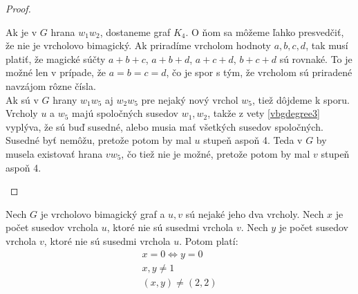 \begin{proof}
\begin{enumerate}
Ak je v $G$ hrana $w_1 w_2$, dostaneme graf $K_4$. O ňom sa môžeme ľahko presvedčiť, že nie je vrcholovo bimagický. Ak priradíme vrcholom hodnoty $a,b,c,d$, tak musí platiť, že magické súčty $a+b+c$, $a+b+d$, $a+c+d$, $b+c+d$ sú rovnaké. To je možné len v prípade, že $a = b = c = d$, čo je spor s tým, že vrcholom sú priradené navzájom rôzne čísla. \\

Ak sú v $G$ hrany $w_1 w_5$ aj $w_2 w_5$ pre nejaký nový vrchol $w_5$, tiež dôjdeme k sporu. Vrcholy $u$ a $w_5$ majú spoločných susedov $w_1, w_2$, takže z vety \ref{vbgdegree3} vyplýva, že sú buď susedné, alebo musia mať všetkých susedov spoločných. Susedné byť nemôžu, pretože potom by mal $u$ stupeň aspoň 4. Teda v $G$ by musela existovať hrana $v w_5$, čo tiež nie je možné, pretože potom by mal $v$ stupeň aspoň 4.
\end{enumerate}
\end{proof}

\begin{theorem} Nech $G$ je vrcholovo bimagický graf a $u,v$ sú nejaké jeho dva vrcholy. Nech $x$ je počet susedov vrchola $u$, ktoré nie sú susedmi vrchola $v$. Nech $y$ je počet susedov vrchola $v$, ktoré nie sú susedmi vrchola $u$. Potom platí:
\begin{gather*}
\label{vbgcondition}
x = 0 \iff y = 0 \\
x,y \neq 1 \\
(x,y) \neq (2,2)
\end{gather*}
\end{theorem}

